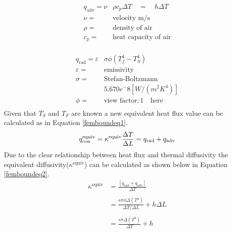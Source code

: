 	\begin{equation} \label{heatconeq}       
	       \begin{aligned}
	       q_{\text{adv}}= \nu &\rho c_p \Delta T \quad = \quad h \Delta T\\	      
	       \nu =& \text{velocity m/s}\\
	       \rho =& \text{density of air}\\
	       c_{p} =& \text{heat capacity of air}\\
          \end{aligned}
	\end{equation}
	       
	\begin{equation} \label{radeq}
	       \begin{aligned}
	       q_{\text{rad}} = \varepsilon&\sigma \phi \left(T_f^4 - T_S^4\right)\\
	       \varepsilon =& \text{emissivity}\\
	       \sigma =& \text{Stefan-Boltzmann} \\&5.670 e^-8 [W/(m^2K^4)]\\
	       \phi =& \text{view factor};1 \quad \text{here}\\
	       \end{aligned}
	\end{equation}
	Given that $T_S$ and $T_F$ are known a new equivalent heat flux value can be calculated as in Equation \ref{femboundeq1}.
	\begin{equation} \label{femboundeq1}
	q_{\text{con}}^{\text{equiv}} = \kappa^{\text{equiv}} \frac{\Delta T}{\Delta L} = q_{\text{rad}} + q_{\text{adv}}\\
	\end{equation}
	Due to the clear relationship between heat flux and thermal diffusivity the equivalent diffusivity($\kappa^{\text{equiv}}$) can be calculated as shown below in Equation \ref{femboundeq2}. 
	\begin{equation}\label{femboundeq2}
	\begin{aligned}
	\kappa^{\text{equiv}} &= \frac{\left[q_{\text{rad}} + q_{\text{adv}} \right]}{\Delta T}\\
	&\quad\\
	&= \frac{\epsilon \sigma \phi \Delta \left(T^4\right)}{\Delta T / \Delta L } + h \Delta L\\
	&\quad\\
	&= \frac{\epsilon \sigma \Delta \left(T^4\right)}{\Delta T   } + h\\
	\end{aligned}
	\end{equation}

